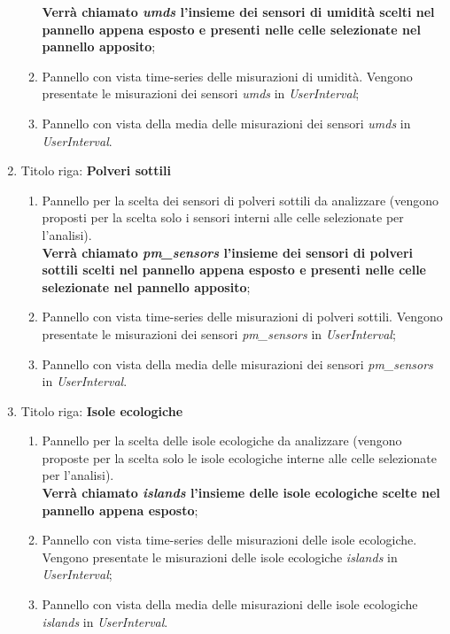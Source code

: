 \begin{enumerate}
\begin{enumerate}
        \textbf{Verrà chiamato \textit{umds} l'insieme dei sensori di umidità scelti nel pannello appena esposto e presenti nelle celle selezionate nel pannello apposito};
        \item Pannello con vista time-series delle misurazioni di umidità. Vengono presentate le misurazioni dei sensori \textit{umds} in \textit{UserInterval};
        \item Pannello con vista della media delle misurazioni dei sensori \textit{umds} in \textit{UserInterval}.
    \end{enumerate}
    \item Titolo riga: \textbf{Polveri sottili}
    \begin{enumerate}
        \item Pannello per la scelta dei sensori di polveri sottili da analizzare (vengono proposti per la scelta solo i sensori interni alle celle selezionate per l'analisi).\\
        \textbf{Verrà chiamato \textit{pm\_sensors} l'insieme dei sensori di polveri sottili scelti nel pannello appena esposto e presenti nelle celle selezionate nel pannello apposito};
        \item Pannello con vista time-series delle misurazioni di polveri sottili. Vengono presentate le misurazioni dei sensori \textit{pm\_sensors} in \textit{UserInterval};
        \item Pannello con vista della media delle misurazioni dei sensori \textit{pm\_sensors} in \textit{UserInterval}.
    \end{enumerate}
    \item Titolo riga: \textbf{Isole ecologiche}
    \begin{enumerate}
        \item Pannello per la scelta delle isole ecologiche da analizzare (vengono proposte per la scelta solo le isole ecologiche interne alle celle selezionate per l'analisi).\\
        \textbf{Verrà chiamato \textit{islands} l'insieme delle isole ecologiche scelte nel pannello appena esposto};
        \item Pannello con vista time-series delle misurazioni delle isole ecologiche. Vengono presentate le misurazioni delle isole ecologiche \textit{islands} in \textit{UserInterval};
        \item Pannello con vista della media delle misurazioni delle isole ecologiche \textit{islands} in \textit{UserInterval}.
    \end{enumerate}

\end{enumerate}
